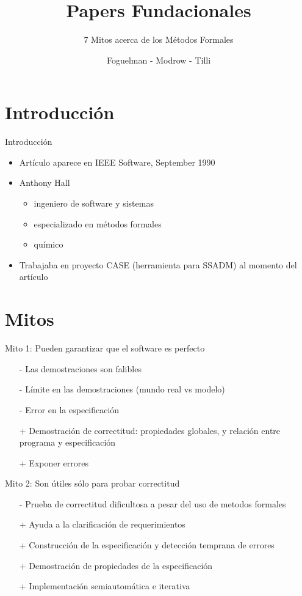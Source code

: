 \documentclass{beamer}
\title{Papers Fundacionales}
\subtitle{7 Mitos acerca de los M\'etodos Formales}
\author{Foguelman - Modrow - Tilli}
\institute{DC - UBA}
\begin{document}
\frame{\titlepage}
\section{Introducci\'on}
\begin{frame}{Introducci\'on}
\begin{itemize}
\item Art\'iculo aparece en IEEE Software, September 1990
\item Anthony Hall 
\begin{itemize}
\item ingeniero de software y sistemas
\item especializado en m\'etodos formales
\item qu\'imico
\end{itemize}
\item Trabajaba en proyecto CASE (herramienta para SSADM) al momento del art\'iculo
\end{itemize}

\end{frame}

\section{Mitos}
\begin{frame}{Mito 1: Pueden garantizar que el software es perfecto }
\begin{itemize}[<+->]
\item[-] Las demostraciones son falibles 
\item[-] L\'imite en las demostraciones (mundo real vs modelo)
\item[-] Error en la especificaci\'on
\item[+] Demostraci\'on de correctitud: propiedades globales, y relaci\'on entre programa y especificaci\'on
\item[+] Exponer errores
\end{itemize}
\end{frame}

\begin{frame}{Mito 2: Son \'utiles s\'olo para probar correctitud}
\begin{itemize}[<+->]
\item[-] Prueba de correctitud dificultosa a pesar del uso de metodos formales
\item[+] Ayuda a la clarificaci\'on de requerimientos
\item[+] Construcci\'on de la especificaci\'on y detecci\'on temprana de errores
\item[+] Demostraci\'on de propiedades de la especificaci\'on
\item[+] Implementaci\'on semiautom\'atica e iterativa
\end{itemize}
\end{frame}
 
\end{document}
